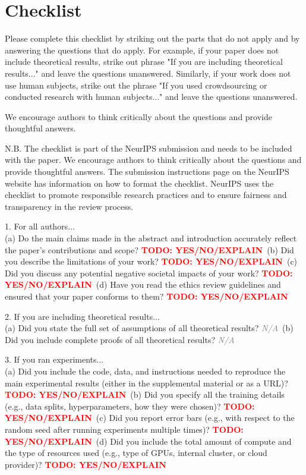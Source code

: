 
\section*{Checklist}

Please complete this checklist by striking out the parts that do not apply and by answering the questions that do apply.
For example, if your paper does not include theoretical results, strike out phrase "If you are including theoretical results..." and leave the questions unanswered.
Similarly, if your work does not use human subjects, strike out the phrase "If you used crowdsourcing or conducted research with human subjects..." and leave the questions unanswered.

We encourage authors to think critically about the questions and provide thoughtful answers.

N.B. The checklist is part of the NeurIPS submission and needs to be included with the paper. We encourage authors to think critically about the questions and provide thoughtful answers. The submission instructions page on the NeurIPS website has information on how to format the checklist. NeurIPS uses the checklist to promote responsible research practices and to ensure fairness and transparency in the review process.

1.  For all authors...\\
(a) Do the main claims made in the abstract and introduction accurately reflect the paper's contributions and scope? \textcolor{red}{\textbf{TODO: YES/NO/EXPLAIN}}\
(b) Did you describe the limitations of your work? \textcolor{red}{\textbf{TODO: YES/NO/EXPLAIN}}\
(c) Did you discuss any potential negative societal impacts of your work? \textcolor{red}{\textbf{TODO: YES/NO/EXPLAIN}}\
(d) Have you read the ethics review guidelines and ensured that your paper conforms to them? \textcolor{red}{\textbf{TODO: YES/NO/EXPLAIN}}

2.  If you are including theoretical results...\\
(a) Did you state the full set of assumptions of all theoretical results? \textcolor{gray}{\textit{N/A}}\
(b) Did you include complete proofs of all theoretical results? \textcolor{gray}{\textit{N/A}}

3.  If you ran experiments...\\
(a) Did you include the code, data, and instructions needed to reproduce the main experimental results (either in the supplemental material or as a URL)? \textcolor{red}{\textbf{TODO: YES/NO/EXPLAIN}}\
(b) Did you specify all the training details (e.g., data splits, hyperparameters, how they were chosen)? \textcolor{red}{\textbf{TODO: YES/NO/EXPLAIN}}\
(c) Did you report error bars (e.g., with respect to the random seed after running experiments multiple times)? \textcolor{red}{\textbf{TODO: YES/NO/EXPLAIN}}\
(d) Did you include the total amount of compute and the type of resources used (e.g., type of GPUs, internal cluster, or cloud provider)? \textcolor{red}{\textbf{TODO: YES/NO/EXPLAIN}}


